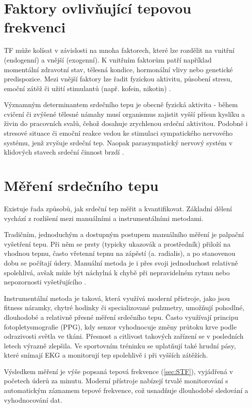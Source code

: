 \section{Faktory ovlivňující tepovou frekvenci}

\acs{TF} může kolísat v závislosti na mnoha faktorech, které lze rozdělit na vnitřní (endogenní) a vnější (exogenní).
K vnitřním faktorům patří například momentální zdravotní stav, tělesná kondice, hormonální vlivy nebo genetické predispozice.
Mezi vnější faktory lze řadit fyzickou aktivitu, působení stresu, emoční zátěž či užití stimulantů (např. kofein, nikotin) \cite{faktoryOvlivnujiciTep}.

Významným determinantem srdečního tepu je obecně fyzická aktivita - během cvičení či zvýšené tělesné námahy musí organismus zajistit vyšší přísun kyslíku a živin do pracovních svalů, čehož dosahuje zrychlenou srdeční aktivitou.
Podobně i stresové situace či emoční reakce vedou ke stimulaci sympatického nervového systému, jenž zvyšuje srdeční tep.
Naopak parasympatický nervový systém v klidových stavech srdeční činnost brzdí \cite{faktoryOvlivnujiciTep}.

\section{Měření srdečního tepu}

Existuje řada způsobů, jak srdeční tep měřit a kvantifikovat.
Základní dělení vychází z rozlišení mezi manuálními a instrumentálními metodami.

Tradičním, jednoduchým a dostupným postupem manuálního měření je palpační vyšetření tepu.
Při něm se prsty (typicky ukazovák a prostředník) přiloží na vhodnou tepnu, často vřetenní tepnu na zápěstí (a. radialis), a po stanovenou dobu se počítají údery.
Manuální metoda je i přes svoji jednoduchost relativně spolehlivá, avšak může být náchylná k chybě při nepravidelném rytmu nebo nepozornosti vyšetřujícího \cite{vnitrniLekarstviVKostce}.

Instrumentální metoda je taková, která využívá moderní přístroje, jako jsou fitness náramky, chytré hodinky či specializované pulzmetry, umožňují pohodlné, dlouhodobé a relativně přesné měření srdečního tepu.
Často využívají principu fotopletysmografie (PPG), kdy senzor vyhodnocuje změny průtoku krve podle odrazivosti světla ve tkáni.
Přesnost a citlivost takových zařízení se v posledních letech výrazně zlepšila.
Ve sportovním tréninku se uplatňují také hrudní pásy, které snímají EKG a monitorují tep spolehlivě i při vyšších zátěžích.

Výsledkem měření je výše popsaná tepová frekvence (\ref{sec:STF}), vyjádřená v početech úderů za minutu.
Moderní přístroje nabízejí trvalé monitorování s automatickým záznamem tepové frekvence, což usnadňuje dlouhodobé sledování a vyhodnocování dat.
